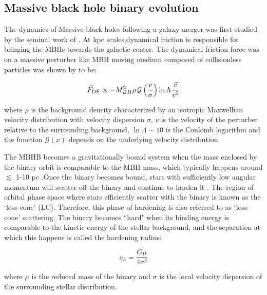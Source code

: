 \documentclass[11pt, letterpaper]{article}
\begin{document}
\subsection{Massive black hole binary evolution}
\label{sec:MBHB-evolution}

The dynamics of Massive black holes following a galaxy merger was first studied by the seminal work of \cite{Begelman1980}. At kpc scales,dynamical friction \citep{Chandreshkar1943,antonini_dynamical_2012} is responsible for bringing the MBHs towards the galactic center. The dynamical friction force was on a massive perturber like MBH moving medium composed of collisionless particles was shown by \citet{Chandreshkar1943} to be:

\begin{equation}
    \vec{F}_{\rm DF} \propto - M^2_{BH} \rho \, \mathcal{G} \left(\frac{v}{\sigma} \right) \ln \Lambda \frac{\vec{v}}{v^3}
\end{equation}

where $\rho$  is the background density characterized by an isotropic Maxwellian velocity distribution with velocity dispersion $\sigma$, $v$ is the velocity of the perturber relative to the surrounding background, $\ln \Lambda \sim 10$ is the
Coulomb logarithm and the function $\mathcal{G}(x)$ depends on the underlying velocity distribution.

The MBHB becomes a gravitationally bound system when the mass enclosed by the binary orbit is comparable to the MBH mass, which typically happens around $\lesssim$ 1-10 pc \citep{Begelman1980,Quinlan_1996,Yu_2002}.Once the binary becomes bound, stars with sufficiently low angular momentum  will scatter off the binary and continue to harden it \citep{Sesana_2008,Quinlan_1996,quinlan_dynamical_1997, Merritt_2005}. The region of orbital phase space where stars efficiently scatter with the binary is known as the `loss cone' (LC). Therefore, this phase of hardening is also referred to as `loss-cone' scattering.  The binary becomes ``hard" when its binding energy is comparable to the kinetic energy of the stellar background, and the separation at which this happens is called the hardening radius:

\begin{equation}
    a_{h} = \frac{G \mu}{4 \sigma^2}
\end{equation}

where $\mu$ is the reduced mass of the binary and $\sigma$ is the local velocity dispersion of the surrounding stellar distribution. 
\end{document}
